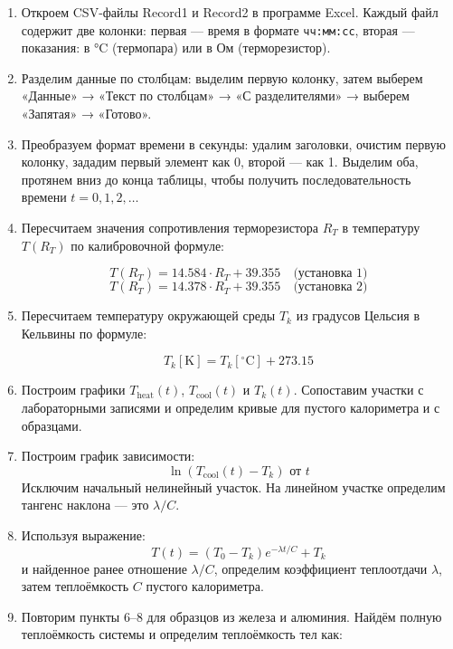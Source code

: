\documentclass[a4paper,12pt]{article} %
\begin{document}
\begin{enumerate}
    \item Откроем CSV-файлы Record1 и Record2 в программе Excel. Каждый файл содержит две колонки: первая — время в формате \texttt{чч:мм:сс}, вторая — показания: в °C (термопара) или в Ом (терморезистор).

    \item Разделим данные по столбцам: выделим первую колонку, затем выберем «Данные» → «Текст по столбцам» → «С разделителями» → выберем «Запятая» → «Готово».

    \item Преобразуем формат времени в секунды: удалим заголовки, очистим первую колонку, зададим первый элемент как 0, второй — как 1. Выделим оба, протянем вниз до конца таблицы, чтобы получить последовательность времени $t = 0, 1, 2, \dots$

    \item Пересчитаем значения сопротивления терморезистора $R_T$ в температуру $T(R_T)$ по калибровочной формуле:

    \[
    T(R_T) = 14.584 \cdot R_T + 39.355 \quad \text{(установка 1)}
    \]
    \[
    T(R_T) = 14.378 \cdot R_T + 39.355 \quad \text{(установка 2)}
    \]

    \item Пересчитаем температуру окружающей среды $T_k$ из градусов Цельсия в Кельвины по формуле:

    \[
    T_k[\text{K}] = T_k[^\circ\text{C}] + 273.15
    \]

    \item Построим графики $T_{\text{heat}}(t)$, $T_{\text{cool}}(t)$ и $T_k(t)$. Сопоставим участки с лабораторными записями и определим кривые для пустого калориметра и с образцами.

    \item Построим график зависимости:
    \[
    \ln(T_{\text{cool}}(t) - T_k) \text{ от } t
    \]
    Исключим начальный нелинейный участок. На линейном участке определим тангенс наклона — это $\lambda / C$.

    \item Используя выражение:
    \[
    T(t) = (T_0 - T_k) e^{-\lambda t / C} + T_k
    \]
    и найденное ранее отношение $\lambda / C$, определим коэффициент теплоотдачи $\lambda$, затем теплоёмкость $C$ пустого калориметра.

    \item Повторим пункты 6–8 для образцов из железа и алюминия. Найдём полную теплоёмкость системы и определим теплоёмкость тел как:


\end{enumerate}
\end{document}
